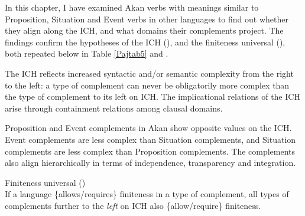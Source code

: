 \documentclass[output=paper]{langscibook}
\begin{document}
In this chapter, I have examined Akan verbs with meanings similar to Proposition, Situation and Event verbs in other languages to find out whether they align along the ICH, and what domains their complements project. The findings confirm the hypotheses of the ICH (\citealt{wurmbrandlohninger2020}), and the finiteness universal (\citealt{wurmbrandetal2020}), both repeated below in Table \ref{Pajtab5} and . 

\begin{table}
\caption{Implicational complementation hierarchy (\citealt{wurmbrandlohninger2020})\label{Pajtab5}}
\end{table}



\begin{exe}
\ex \label{Paj27} \citet{wurmbrandlohninger2020}
\begin{xlist}
\ex \label{Paj27a}
The ICH reflects increased syntactic and/or semantic complexity from the right to the left: a type of complement can 	never be obligatorily more complex than the type of	complement to its left on ICH. 
\ex \label{Paj27b}
The implicational relations of the ICH arise through containment relations among clausal domains. 
\end{xlist}
\end{exe}


Proposition and Event complements in Akan show opposite values on the ICH. Event complements are less complex than Situation complements, and Situation complements are less complex than Proposition complements. The complements also align hierarchically in terms of independence, transparency and integration. 

\begin{exe} 
\ex \label{Paj28} Finiteness universal (\citealt{wurmbrandetal2020}) \\
If a language \{allows/requires\} finiteness in a type of complement, all types of complements further to the \emph{left} on ICH also \{allow/require\} finiteness.
\end{exe}
\end{document}
